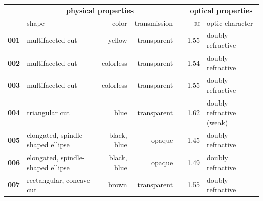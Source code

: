 \documentclass[10pt]{article}
\theoremstyle{definition}
\begin{document}
\begin{table}[h]\footnotesize
\centering
{\renewcommand{\arraystretch}{1.2}
\begin{tabular}{lp{5em}rrrrp{7.5em}}
\hline
                                   & \multicolumn{3}{c}{\textbf{physical properties}}                                                                                                                  & & \multicolumn{2}{c}{\textbf{optical properties}}                                                                                      \\ \cline{2-4} \cline{6-7}
 & shape & color & transmission & & \textsc{ri} & optic character \\ \hline
\textbf{001}                                & multifaceted cut                   & yellow                                     & transparent                               &  & 1.55                                          & doubly refractive                            \\
\textbf{002}                                & multifaceted cut                   & colorless                                  & transparent                               &  & 1.54                                          & doubly refractive                            \\
\textbf{003}                                & multifaceted cut                   & colorless                                  & transparent                               &  & 1.55                                          & doubly refractive                            \\
\textbf{004}                                & triangular cut                     & blue                                       & transparent                               &  & 1.62                                          & doubly refractive (weak)                     \\
\textbf{005}                                & elongated, spindle-shaped ellipse  & black, blue                                      & opaque                                    &  & 1.45                                          & doubly refractive                            \\
\textbf{006}                                & elongated, spindle-shaped ellipse  & black, blue                                      & opaque                                    &  & 1.49                                          & doubly refractive                            \\
\textbf{007}                                & rectangular, concave cut           & brown                                      & transparent                               &  & 1.55                                          & doubly refractive                            \\

\end{tabular}}
\end{table}
\end{document}
